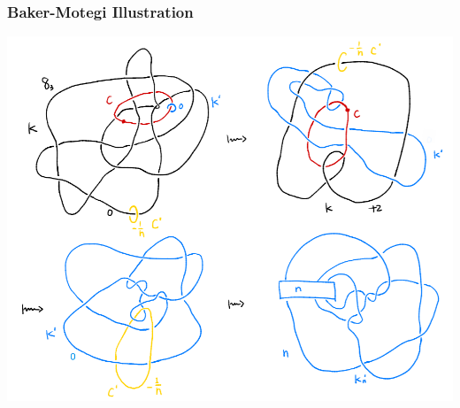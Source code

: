 \documentclass{beamer}
\theoremstyle{ex}
\theoremstyle{rem}
\begin{document}
	\begin{frame}
		\frametitle{Baker-Motegi Illustration}
		\begin{center}
			\includegraphics[scale=0.5]{bm}
		\end{center}
	\end{frame}
\end{document}
